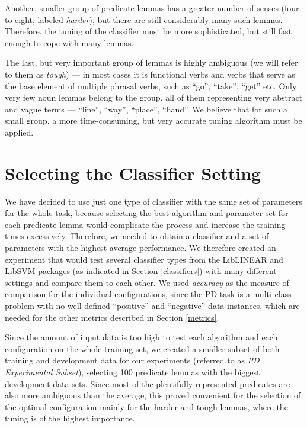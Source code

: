 \documentclass[12pt,notitlepage]{report}
\begin{document}
Another, smaller group of predicate lemmas has a greater number of senses (four to eight, labeled \emph{harder}), but there are still considerably many such lemmas. Therefore, the tuning of the classifier must be more sophisticated, but still fast enough to cope with many lemmas.

The last, but very important group of lemmas is highly ambiguous (we will refer to them as \emph{tough}) --- in most cases it is functional verbs and verbs that serve as the base element of multiple phrasal verbs, such as ``go'', ``take'', ``get'' etc. Only very few noun lemmas belong to the group, all of them representing very abstract and vague terms --- ``line'', ``way'', ``place'', ``hand''. We believe that for such a small group, a more time-consuming, but very accurate tuning algorithm must be applied.

\section{Selecting the Classifier Setting}\label{classifier-setting}

We have decided to use just one type of classifier with the same set of parameters for the whole task, because selecting the best algorithm and parameter set for each predicate lemma would complicate the process and increase the training times excessively. Therefore, we needed to obtain a classifier and a set of parameters with the highest average performance. We therefore created an experiment that would test several classifier types from the LibLINEAR and LibSVM packages (as indicated in Section \ref{classifiers}) with many different settings and compare them to each other. We used \emph{accuracy} as the measure of comparison for the individual configurations, since the PD task is a multi-class problem with no well-defined ``positive'' and ``negative'' data instances, which are needed for the other metrics described in Section \ref{metrics}.

Since the amount of input data is too high to test each algorithm and each configuration on the whole training set, we created a smaller subset of both training and development data for our experiments (referred to as \emph{PD Experimental Subset}), selecting 100 predicate lemmas with the biggest development data sets. Since most of the plentifully represented predicates are also more ambiguous than the average, this proved convenient for the selection of the optimal configuration mainly for the harder and tough lemmas, where the tuning is of the highest importance.
\end{document}
